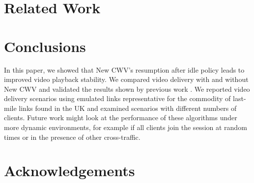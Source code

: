 \documentclass[10pt,sigconf]{acmart}
\begin{document}
\section{Related Work}


%
% 



\section{Conclusions}


In this paper, we showed that New CWV's resumption after idle policy leads to improved video playback stability. We compared video delivery with and without New CWV and validated the results shown by previous work \cite{Nazir-2014-performance-evaluation-congestion-window-validation-dash-newcwv}. We reported video delivery scenarios using emulated links representative for the commodity of last-mile links found in the UK and examined scenarios with different numbers of clients. Future work might look at the performance of these algorithms under more dynamic environments, for example if all clients join the session at random times or in the presence of other cross-traffic. 



\section{Acknowledgements}


%
\end{document}
